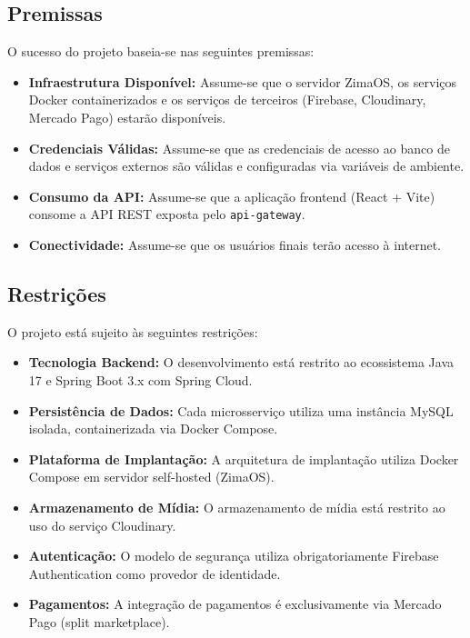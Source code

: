 \documentclass[
    12pt, 
    a4paper, 
    oneside, 
    chapter=TITLE, 
    section=TITLE
]{abntex2}
\begin{document}
\subsection*{Premissas}
O sucesso do projeto baseia-se nas seguintes premissas:
\begin{itemize}
    \item \textbf{Infraestrutura Disponível:} Assume-se que o servidor ZimaOS, os serviços Docker containerizados e os serviços de terceiros (Firebase, Cloudinary, Mercado Pago) estarão disponíveis.
    \item \textbf{Credenciais Válidas:} Assume-se que as credenciais de acesso ao banco de dados e serviços externos são válidas e configuradas via variáveis de ambiente.
    \item \textbf{Consumo da API:} Assume-se que a aplicação frontend (React + Vite) consome a API REST exposta pelo \texttt{api-gateway}.
    \item \textbf{Conectividade:} Assume-se que os usuários finais terão acesso à internet.
\end{itemize}

\subsection*{Restrições}
O projeto está sujeito às seguintes restrições:
\begin{itemize}
    \item \textbf{Tecnologia Backend:} O desenvolvimento está restrito ao ecossistema Java 17 e Spring Boot 3.x com Spring Cloud.
    \item \textbf{Persistência de Dados:} Cada microsserviço utiliza uma instância MySQL isolada, containerizada via Docker Compose.
    \item \textbf{Plataforma de Implantação:} A arquitetura de implantação utiliza Docker Compose em servidor self-hosted (ZimaOS).
    \item \textbf{Armazenamento de Mídia:} O armazenamento de mídia está restrito ao uso do serviço Cloudinary.
    \item \textbf{Autenticação:} O modelo de segurança utiliza obrigatoriamente Firebase Authentication como provedor de identidade.
    \item \textbf{Pagamentos:} A integração de pagamentos é exclusivamente via Mercado Pago (split marketplace).
\end{itemize}
\end{document}
